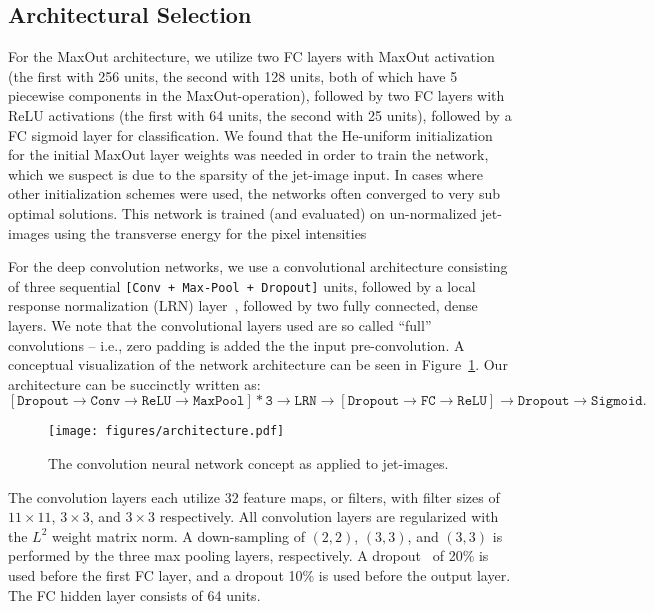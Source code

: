 \subsection{Architectural Selection} %
\label{ssub:architectural_selection}
For the MaxOut architecture, we utilize two FC layers with MaxOut activation (the first with 256 units, the second with 128 units, both of which have 5 piecewise components in the MaxOut-operation), followed by two FC layers with ReLU activations (the first with 64 units, the second with 25 units), followed by a FC sigmoid layer for classification. We found that the He-uniform initialization~\cite{HE_initialization} for the initial MaxOut layer weights was needed in order to train the network, which we suspect is due to the sparsity of the jet-image input. In cases where other initialization schemes were used, the networks often converged to very sub optimal solutions.  This network is trained (and evaluated) on un-normalized jet-images using the transverse energy for the pixel intensities

For the deep convolution networks, we use a convolutional architecture consisting of three sequential \texttt{[Conv + Max-Pool + Dropout]} units, followed by a local response normalization (LRN) layer~\cite{dropout:and:LRN}, followed by two fully connected, dense layers. We note that the convolutional layers used are so called ``full'' convolutions -- i.e., zero padding is added the the input pre-convolution. A conceptual visualization of the network architecture can be seen in Figure~\ref{fig:arch}. Our architecture can be succinctly written as:
\begin{equation}
  \mathtt{[Dropout \rightarrow Conv \rightarrow ReLU \rightarrow MaxPool] * 3 \rightarrow LRN \rightarrow [Dropout \rightarrow FC \rightarrow ReLU]  \rightarrow Dropout \rightarrow Sigmoid}.
\end{equation}

\begin{figure}[!htbp]
  \centering
  \texttt{[image: figures/architecture.pdf]}
  \caption{The convolution neural network concept as applied to jet-images.}
  \label{fig:arch}
\end{figure}

The convolution layers each utilize 32 feature maps, or filters, with filter sizes of $11\times 11$, $3\times 3$, and $3\times 3$ respectively.  All convolution layers are regularized with the $L^{2}$ weight matrix norm.  A down-sampling of $(2, 2)$, $(3, 3)$, and $(3, 3)$ is performed by the three max pooling layers, respectively.  A dropout~\cite{dropout:and:LRN} of 20\% is used before the first FC layer, and a dropout 10\% is used before the output layer.  The FC hidden layer consists of 64 units.

